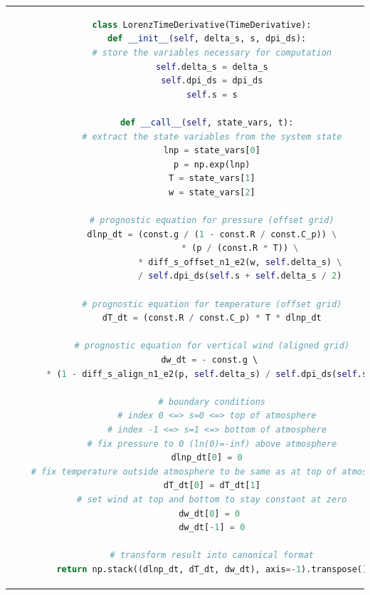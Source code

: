 \begin{tabular}{c}
\begin{lstlisting}[language=Python]
class LorenzTimeDerivative(TimeDerivative):
  def __init__(self, delta_s, s, dpi_ds):
    # store the variables necessary for computation
    self.delta_s = delta_s
    self.dpi_ds = dpi_ds
    self.s = s

  def __call__(self, state_vars, t):
    # extract the state variables from the system state
    lnp = state_vars[0]
    p = np.exp(lnp)
    T = state_vars[1]
    w = state_vars[2]
	
    # prognostic equation for pressure (offset grid)
    dlnp_dt = (const.g / (1 - const.R / const.C_p)) \
               * (p / (const.R * T)) \
               * diff_s_offset_n1_e2(w, self.delta_s) \
               / self.dpi_ds(self.s + self.delta_s / 2)
    
    # prognostic equation for temperature (offset grid)
    dT_dt = (const.R / const.C_p) * T * dlnp_dt
    
    # prognostic equation for vertical wind (aligned grid)
    dw_dt = - const.g \ 
    * (1 - diff_s_align_n1_e2(p, self.delta_s) / self.dpi_ds(self.s))
	
    # boundary conditions
      # index 0 <=> s=0 <=> top of atmosphere
      # index -1 <=> s=1 <=> bottom of atmosphere
    # fix pressure to 0 (ln(0)=-inf) above atmosphere
    dlnp_dt[0] = 0  
    # fix temperature outside atmosphere to be same as at top of atmosphere
    dT_dt[0] = dT_dt[1]
    # set wind at top and bottom to stay constant at zero
    dw_dt[0] = 0 
    dw_dt[-1] = 0

    # transform result into canonical format
    return np.stack((dlnp_dt, dT_dt, dw_dt), axis=-1).transpose()
\end{lstlisting}
\end{tabular}\\



